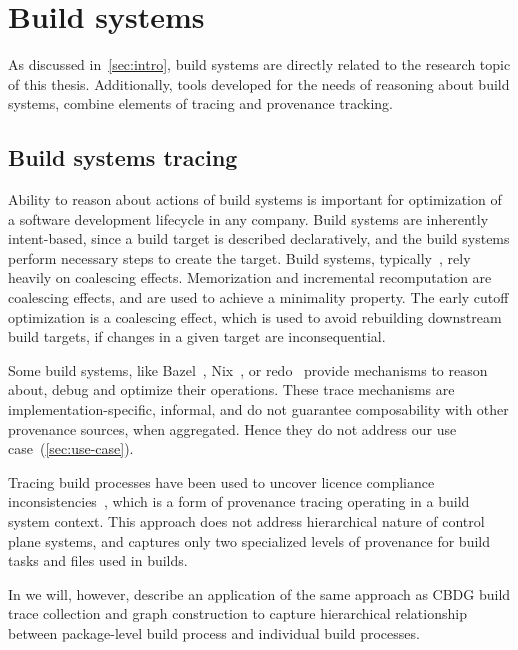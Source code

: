 \section{Build systems}

As discussed in~\cref{sec:intro}, build systems are directly related to the research topic of this thesis. Additionally, tools developed for the needs of reasoning about build systems, combine elements of tracing and provenance tracking.

\subsection{Build systems tracing}

Ability to reason about actions of build systems is important for optimization of a software development lifecycle in any company.  Build systems are inherently intent-based, since a build target is described declaratively, and the build systems perform necessary steps to create the target.  Build systems, typically~\cite{Mokhov2020}, rely heavily on coalescing effects. Memorization and incremental recomputation are coalescing effects, and are used to achieve a minimality property. 
The early cutoff optimization is a coalescing effect, which is used to avoid rebuilding downstream build targets, if changes in a given target are inconsequential.

Some build systems, like Bazel~\cite{bazelPerf:online}, Nix~\cite[p.~176]{dolstra2006nixThesis}, or redo~\cite{redolog} provide mechanisms to reason about, debug and optimize their operations. These trace mechanisms are implementation-specific, informal, and do not guarantee composability with other provenance sources, when aggregated. Hence they do not address our use case~(\cref{sec:use-case}).

Tracing build processes have been used to uncover licence compliance inconsistencies~\cite{vanderBurg2014Sep}, which is a form of provenance tracing operating in a build system context.  This approach does not address hierarchical nature of control plane systems, and captures only two specialized levels of provenance for build tasks and files used in builds.

In  we will, however, describe an application of the same approach as CBDG build trace collection and graph construction to capture hierarchical relationship between package-level build process and individual build processes.

